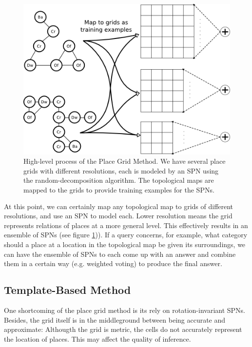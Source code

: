 \documentclass[10pt, titlepage]{article}
\theoremstyle{definition}
\begin{document}
\begin{figure}[!htb]
    \centering
    \captionsetup{width=.8\linewidth}
    \includegraphics[scale=0.6]{images/grid_method.png}
    \caption{High-level process of the Place Grid Method. We have several place grids with different resolutions, each is modeled by an SPN using the random-decomposition algorithm. The topological maps are mapped to the grids to provide training examples for the SPNs.}
    \label{fig:topomap}
\end{figure}

At this point, we can certainly map any topological map to grids of different resolutions, and use an SPN to model each. Lower resolution means the grid represents relations of places at a more general level. This effectively results in an ensemble of SPNs (see figure \ref{fig:topomap})). If a query concerns, for example, what category should a place at a location in the topological map be given its surroundings, we can have the ensemble of SPNs to each come up with an answer and combine them in a certain way (e.g. weighted voting) to produce the final answer. 

\subsection{Template-Based Method}\label{section:tmpl}

One shortcoming of the place grid method is its rely on rotation-invariant SPNs. Besides, the grid itself is in the middleground between being accurate and approximate: Althougth the grid is metric, the cells do not accurately represent the location of places. This may affect the quality of inference.
\end{document}

